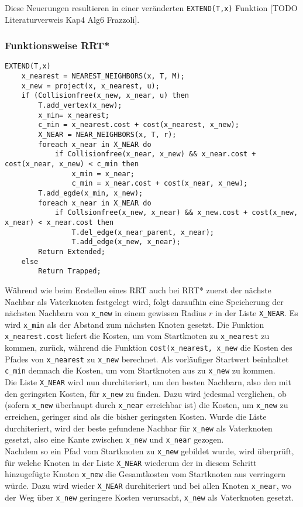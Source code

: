 Diese Neuerungen resultieren in einer veränderten \verb|EXTEND(T,x)| Funktion [TODO Literaturverweis Kap4 Alg6 Frazzoli].
\subsubsection{Funktionsweise RRT*}
\begin{lstlisting}
EXTEND(T,x)
	x_nearest = NEAREST_NEIGHBORS(x, T, M);
	x_new = project(x, x_nearest, u);
	if (Collisionfree(x_new, x_near, u) then
		T.add_vertex(x_new);
		x_min= x_nearest;
		c_min = x_nearest.cost + cost(x_nearest, x_new);
		X_NEAR = NEAR_NEIGHBORS(x, T, r);
		foreach x_near in X_NEAR do
			if Collisionfree(x_near, x_new) && x_near.cost + cost(x_near, x_new) < c_min then
				x_min = x_near;
				c_min = x_near.cost + cost(x_near, x_new);
		T.add_egde(x_min, x_new);
		foreach x_near in X_NEAR do
			if Collsionfree(x_new, x_near) && x_new.cost + cost(x_new, x_near) < x_near.cost then
				T.del_edge(x_near_parent, x_near);
				T.add_edge(x_new, x_near);
		Return Extended;
	else
		Return Trapped;
\end{lstlisting}

Während wie beim Erstellen eines RRT auch bei RRT* zuerst der nächste Nachbar als Vaterknoten festgelegt wird, folgt daraufhin eine Speicherung der nächsten Nachbarn von \verb|x_new| in einem gewissen Radius $r$ in der Liste \verb|X_NEAR|. 
Es wird \verb|x_min| als der Abstand zum nächsten Knoten gesetzt. Die Funktion \verb|x_nearest.cost| liefert die Kosten, um vom Startknoten zu \verb|x_nearest| zu kommen, zurück, während die Funktion \verb|cost(x_nearest, x_new| die Kosten des Pfades von \verb|x_nearest| zu \verb|x_new| berechnet. Als vorläufiger Startwert beinhaltet \verb|c_min| demnach die Kosten, um vom Startknoten aus zu \verb|x_new| zu kommen. \\
Die Liste \verb|X_NEAR| wird nun durchiteriert, um den besten Nachbarn, also den mit den geringsten Kosten, für \verb|x_new| zu finden. Dazu wird jedesmal verglichen, ob (sofern \verb|x_new| überhaupt durch \verb|x_near| erreichbar ist) die Kosten, um \verb|x_new| zu erreichen, geringer sind als die bisher geringsten Kosten. Wurde die Liste durchiteriert, wird der beste gefundene Nachbar für \verb|x_new| als Vaterknoten gesetzt, also eine Kante zwischen \verb|x_new| und \verb|x_near| gezogen. \\
Nachdem so ein Pfad vom Startknoten zu \verb|x_new| gebildet wurde, wird überprüft, für welche Knoten in der Liste \verb|X_NEAR| wiederum der in diesem Schritt hinzugefügte Knoten \verb|x_new| die Gesamtkosten vom Startknoten aus verringern würde. Dazu wird wieder \verb|X_NEAR| durchiteriert und bei allen Knoten \verb|x_near|, wo der Weg über \verb|x_new| geringere Kosten verursacht, \verb|x_new| als Vaterknoten gesetzt.
